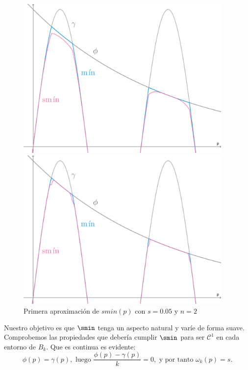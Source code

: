 \begin{figure}[!h]
     \begin{minipage}[c]{0.49\linewidth}
        \centering
        \includegraphics[width=0.95\textwidth]{Plantilla-TFG-master/img/smin_1.png}
        \caption{$k=0.6$}
     \end{minipage}
     \begin{minipage}[c]{0.49\linewidth}
        \centering
        \includegraphics[width=0.95\textwidth]{Plantilla-TFG-master/img/smin_2.png}
        \caption{$k=0.1$}
     \end{minipage}
     \caption{Primera aproximación de $smin(p)$ con $s=0.05$ y $n=2$}
     \label{fig:smooth1}
\end{figure}

Nuestro objetivo es que $\smin$ tenga un aspecto natural y varíe de forma suave. Comprobemos las propiedades que debería cumplir $\smin$ para ser $\mathcal{C}^1$ en cada entorno de $B_k$. Que es continua es evidente:
\begin{equation*}
    \phi(p)=\gamma(p), \text{ luego } \frac{\phi(p)-\gamma(p)}{k} = 0, \text{ y por tanto } \omega_k(p) = s.
\end{equation*}

